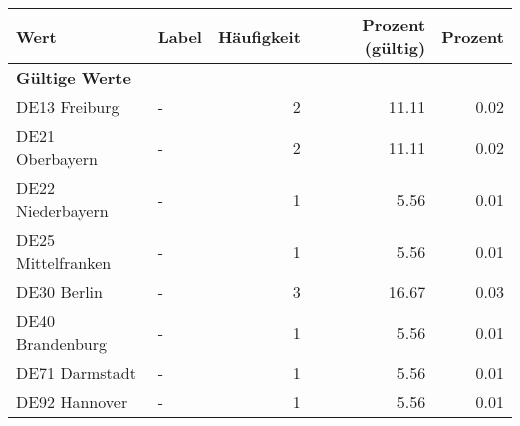      \begin{longtable}{Xlrrr}
     \toprule
     \textbf{Wert} & \textbf{Label} & \textbf{Häufigkeit} & \textbf{Prozent (gültig)} & \textbf{Prozent} \\
     \endhead
     \midrule
     \multicolumn{5}{l}{\textbf{Gültige Werte}}\\

     \multicolumn{1}{X}{DE13 Freiburg} &
     - &
     \num{2} &
     \num[round-mode=places,round-precision=2]{11.11} &
     \num[round-mode=places,round-precision=2]{0.02} \\

     \multicolumn{1}{X}{DE21 Oberbayern} &
     - &
     \num{2} &
     \num[round-mode=places,round-precision=2]{11.11} &
     \num[round-mode=places,round-precision=2]{0.02} \\

     \multicolumn{1}{X}{DE22 Niederbayern} &
     - &
     \num{1} &
     \num[round-mode=places,round-precision=2]{5.56} &
     \num[round-mode=places,round-precision=2]{0.01} \\

     \multicolumn{1}{X}{DE25 Mittelfranken} &
     - &
     \num{1} &
     \num[round-mode=places,round-precision=2]{5.56} &
     \num[round-mode=places,round-precision=2]{0.01} \\

     \multicolumn{1}{X}{DE30 Berlin} &
     - &
     \num{3} &
     \num[round-mode=places,round-precision=2]{16.67} &
     \num[round-mode=places,round-precision=2]{0.03} \\

     \multicolumn{1}{X}{DE40 Brandenburg} &
     - &
     \num{1} &
     \num[round-mode=places,round-precision=2]{5.56} &
     \num[round-mode=places,round-precision=2]{0.01} \\

     \multicolumn{1}{X}{DE71 Darmstadt} &
     - &
     \num{1} &
     \num[round-mode=places,round-precision=2]{5.56} &
     \num[round-mode=places,round-precision=2]{0.01} \\

     \multicolumn{1}{X}{DE92 Hannover} &
     - &
     \num{1} &
     \num[round-mode=places,round-precision=2]{5.56} &
     \num[round-mode=places,round-precision=2]{0.01} \\


\end{longtable}
